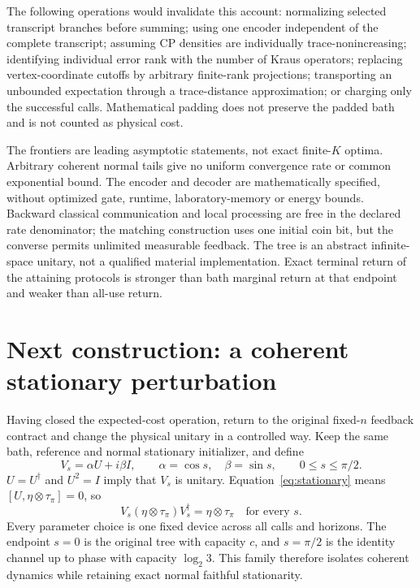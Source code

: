 \documentclass[11pt]{article}
\begin{document}
The following operations would invalidate this account: normalizing selected transcript branches before summing; using one encoder independent of the complete transcript; assuming CP densities are individually trace-nonincreasing; identifying individual error rank with the number of Kraus operators; replacing vertex-coordinate cutoffs by arbitrary finite-rank projections; transporting an unbounded expectation through a trace-distance approximation; or charging only the successful calls. Mathematical padding does not preserve the padded bath and is not counted as physical cost.

The frontiers are leading asymptotic statements, not exact finite-$K$ optima. Arbitrary coherent normal tails give no uniform convergence rate or common exponential bound. The encoder and decoder are mathematically specified, without optimized gate, runtime, laboratory-memory or energy bounds. Backward classical communication and local processing are free in the declared rate denominator; the matching construction uses one initial coin bit, but the converse permits unlimited measurable feedback. The tree is an abstract infinite-space unitary, not a qualified material implementation. Exact terminal return of the attaining protocols is stronger than bath marginal return at that endpoint and weaker than all-use return.

\section{Next construction: a coherent stationary perturbation}\label{sec:coherent}

Having closed the expected-cost operation, return to the original fixed-$n$ feedback contract and change the physical unitary in a controlled way. Keep the same bath, reference and normal stationary initializer, and define
\begin{equation}
 V_s=\alpha U+i\beta I,\qquad \alpha=\cos s,\quad\beta=\sin s,
 \qquad 0\le s\le\pi/2.\label{eq:partialswap}
\end{equation}
$U=U^\dagger$ and $U^2=I$ imply that $V_s$ is unitary. Equation~\eqref{eq:stationary} means $[U,\eta\otimes\tau_\pi]=0$, so
\begin{equation}
 V_s(\eta\otimes\tau_\pi)V_s^\dagger=\eta\otimes\tau_\pi\quad\text{for every }s.\label{eq:partialstationary}
\end{equation}
Every parameter choice is one fixed device across all calls and horizons. The endpoint $s=0$ is the original tree with capacity $c$, and $s=\pi/2$ is the identity channel up to phase with capacity $\log_2 3$. This family therefore isolates coherent dynamics while retaining exact normal faithful stationarity.
\end{document}
